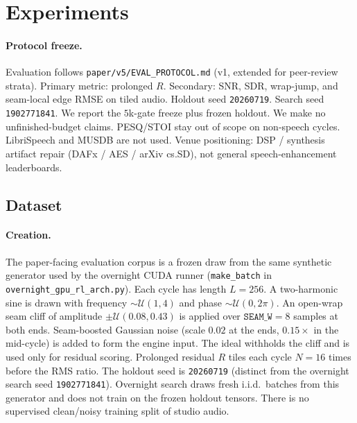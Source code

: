 \section{Experiments}
\label{sec:experiments}

\paragraph{Protocol freeze.}
Evaluation follows \texttt{paper/v5/EVAL\_PROTOCOL.md} (v1, extended for peer-review strata).
Primary metric: prolonged $R$. Secondary: SNR, SDR, wrap-jump, and seam-local edge RMSE on tiled audio.
Holdout seed \texttt{20260719}. Search seed \texttt{1902771841}.
We report the $5$k-gate freeze plus frozen holdout. We make no unfinished-budget claims. PESQ/STOI stay out of scope on non-speech cycles.
LibriSpeech and MUSDB are not used.
Venue positioning: DSP / synthesis artifact repair (DAFx / AES / arXiv cs.SD), not general speech-enhancement leaderboards.

\subsection{Dataset}
\label{sec:dataset}

\paragraph{Creation.}
The paper-facing evaluation corpus is a frozen draw from the same synthetic generator used by the overnight CUDA runner (\texttt{make\_batch} in \texttt{overnight\_gpu\_rl\_arch.py}).
Each cycle has length $L{=}256$.
A two-harmonic sine is drawn with frequency $\sim\mathcal{U}(1,4)$ and phase $\sim\mathcal{U}(0,2\pi)$.
An open-wrap seam cliff of amplitude $\pm\mathcal{U}(0.08,0.43)$ is applied over $\texttt{SEAM\_W}{=}8$ samples at both ends.
Seam-boosted Gaussian noise (scale $0.02$ at the ends, $0.15\times$ in the mid-cycle) is added to form the engine input.
The ideal withholds the cliff and is used only for residual scoring.
Prolonged residual $R$ tiles each cycle $N{=}16$ times before the RMS ratio.
The holdout seed is \texttt{20260719} (distinct from the overnight search seed \texttt{1902771841}).
Overnight search draws fresh i.i.d.\ batches from this generator and does not train on the frozen holdout tensors.
There is no supervised clean/noisy training split of studio audio.

